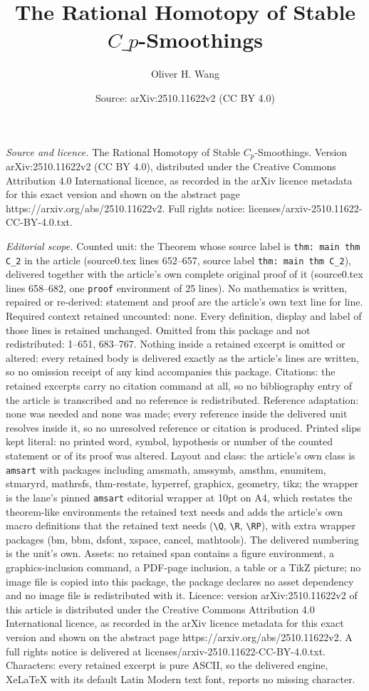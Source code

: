\documentclass[10pt,a4paper]{amsart}
\title[The Rational Homotopy of Stable $C\_p$-Smoothings]{The Rational Homotopy of Stable $C\_p$-Smoothings}
\author{Oliver H. Wang}
\date{Source: arXiv:2510.11622v2 (CC BY 4.0)}
\begin{document}
\maketitle

\noindent\emph{Source and licence.} The Rational Homotopy of Stable $C_p$-Smoothings. Version arXiv:2510.11622v2 (CC BY 4.0), distributed under the Creative Commons Attribution 4.0 International licence, as recorded in the arXiv licence metadata for this exact version and shown on the abstract page https://arxiv.org/abs/2510.11622v2. Full rights notice: licenses/arxiv-2510.11622-CC-BY-4.0.txt.\par\smallskip

\noindent\textit{Editorial scope.} Counted unit: the Theorem whose source label is \texttt{thm: main thm C\_2} in the article (source0.tex lines 652--657, source label \texttt{thm: main thm C\_2}), delivered together with the article's own complete original proof of it (source0.tex lines 658--682, one \texttt{proof} environment of 25 lines). No mathematics is written, repaired or re-derived: statement and proof are the article's own text line for line. Required context retained uncounted: none. Every definition, display and label of those lines is retained unchanged. Omitted from this package and not redistributed: 1--651, 683--767. Nothing inside a retained excerpt is omitted or altered: every retained body is delivered exactly as the article's lines are written, so no omission receipt of any kind accompanies this package. Citations: the retained excerpts carry no citation command at all, so no bibliography entry of the article is transcribed and no reference is redistributed. Reference adaptation: none was needed and none was made; every reference inside the delivered unit resolves inside it, so no unresolved reference or citation is produced. Printed slips kept literal: no printed word, symbol, hypothesis or number of the counted statement or of its proof was altered. Layout and class: the article's own class is \texttt{amsart} with packages including amsmath, amssymb, amsthm, enumitem, stmaryrd, mathrsfs, thm-restate, hyperref, graphicx, geometry, tikz; the wrapper is the lane's pinned \texttt{amsart} editorial wrapper at 10pt on A4, which restates the theorem-like environments the retained text needs and adds the article's own macro definitions that the retained text needs (\texttt{\textbackslash Q}, \texttt{\textbackslash R}, \texttt{\textbackslash RP}), with extra wrapper packages (bm, bbm, dsfont, xspace, cancel, mathtools). The delivered numbering is the unit's own. Assets: no retained span contains a figure environment, a graphics-inclusion command, a PDF-page inclusion, a table or a TikZ picture; no image file is copied into this package, the package declares no asset dependency and no image file is redistributed with it. Licence: version arXiv:2510.11622v2 of this article is distributed under the Creative Commons Attribution 4.0 International licence, as recorded in the arXiv licence metadata for this exact version and shown on the abstract page https://arxiv.org/abs/2510.11622v2. A full rights notice is delivered at licenses/arxiv-2510.11622-CC-BY-4.0.txt. Characters: every retained excerpt is pure ASCII, so the delivered engine, XeLaTeX with its default Latin Modern text font, reports no missing character.
\end{document}
